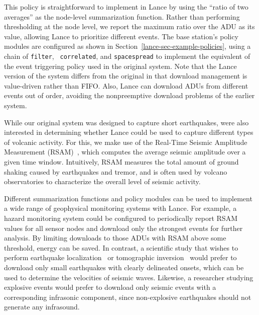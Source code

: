 This policy is straightforward to implement in Lance by using the ``ratio of
two averages'' as the node-level summarization function.  Rather than
performing thresholding at the node level, we report the maximum ratio over
the ADU as its value, allowing Lance to prioritize different events. The base
station's policy modules are configured as shown in
Section~\ref{lance-sec-example-policies}, using a chain of {\tt filter}, {\tt
correlated}, and {\tt spacespread} to implement the equivalent of the event
triggering policy used in the original system. Note that the Lance version of
the system differs from the original in that download management is
value-driven rather than FIFO. Also, Lance can download ADUs from different
events out of order, avoiding the nonpreemptive download problems of the
earlier system.

While our original system was designed to capture short earthquakes,
were also interested in determining whether Lance could be used to
capture different types of volcanic activity. For this, we make use of
the Real-Time Seismic Amplitude Measurement (RSAM)~\cite{rsam}, which
computes the average seismic amplitude over a given time window. 
Intuitively, RSAM measures 
the total amount of ground shaking caused by earthquakes and tremor,
and is often used by volcano
observatories to characterize the overall level of seismic activity.

Different summarization functions and policy modules can be used to implement
a wide range of geophysical monitoring systems with Lance. For example, a
hazard monitoring system could be configured to periodically report RSAM
values for all sensor nodes and download only the strongest events for
further analysis. By limiting downloads to those ADUs with RSAM above some
threshold, energy can be saved. In contrast, a scientific study that wishes
to perform earthquake localization~\cite{aki-richards-80} or tomographic
inversion~\cite{lees-lindley-94} would prefer to download only small
earthquakes with clearly delineated onsets, which can be used to determine
the velocities of seismic waves. Likewise, a researcher studying explosive
events would prefer to download only seismic events with a corresponding
infrasonic component, since non-explosive earthquakes should not generate any
infrasound.

